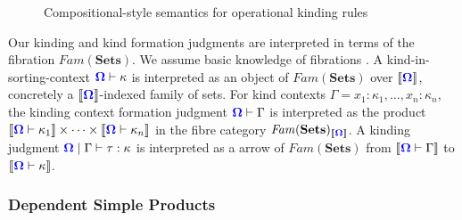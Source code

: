 \documentclass[sigplan,10pt,review,anonymous]{acmart}
\newcommand{\blum}[1]{\mathbf{\color{blue}{#1}}}
\newcommand{\defeq}{\overset{\mathit{def}}{=}}
\newcommand{\sem}[1]{\llbracket #1 \rrbracket}
\newcommand{\mbf}[1]{\mathbf{#1}}
\begin{document}
\begin{figure}

\caption{Compositional-style semantics for operational kinding rules}
\end{figure}

Our kinding and kind formation judgments are interpreted in terms of the fibration $\mathit{Fam}(\mbf{Sets})$. We assume basic knowledge of fibrations \cite{}. A kind-in-sorting-context $\blum{\Omega} \vdash \kappa$ is interpreted as an object of $\mathit{Fam}(\mbf{Sets})$ over $\sem{\blum{\Omega}}$, concretely a $\sem{\blum{\Omega}}$-indexed family of sets. For kind contexts $\Gamma = x_1:\kappa_1,\ldots,x_n : \kappa_n$, the kinding context formation judgment $\blum{\Omega} \vdash \Gamma$ is interpreted as the product $\sem{\blum{\Omega} \vdash \kappa_1} \times \cdots \times \sem{\blum{\Omega} \vdash \kappa_n}$ in the fibre category $\mathit{Fam}(\mbf{Sets})_{\sem{\blum{\Omega}}}$. A kinding judgment $\blum{\Omega} \mid \Gamma \vdash \tau : \kappa$ is interpreted as a arrow of $\mathit{Fam}(\mbf{Sets})$ from $\sem{\blum{\Omega} \vdash \Gamma}$ to $\sem{\blum{\Omega} \vdash \kappa}$. 

\subsubsection{Dependent Simple Products}
\end{document}

